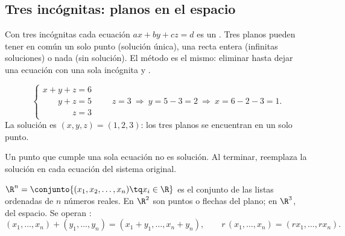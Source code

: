 \documentclass[11pt,a4paper]{article}
\let\zukanivel\nivel
\renewcommand{\nivel}[2]{\needspace{5\baselineskip}\zukanivel{#1}{#2}}
\begin{document}
\subsection{Tres incógnitas: planos en el espacio}
Con tres incógnitas cada ecuación $ax+by+cz=d$ es un . Tres planos pueden tener en común
un solo punto (solución única), una recta entera (infinitas soluciones) o nada (sin solución).
El método es el mismo: eliminar hasta dejar una ecuación con una sola incógnita y .

\begin{ejemplo}
\[ \begin{cases} x+y+z=6\\ \phantom{x+{}}y+z=5\\ \phantom{x+y+{}}z=3 \end{cases}
\qquad z=3\ \Longrightarrow\ y=5-3=2\ \Longrightarrow\ x=6-2-3=1. \]
La solución es $(x,y,z)=(1,2,3)$: los tres planos se encuentran en un solo punto.
\end{ejemplo}

\begin{ojo}
Un punto que cumple una sola ecuación no es solución. Al terminar, reemplaza la solución en cada ecuación del sistema original.
\end{ojo}


\begin{definicion}[El conjunto $\R^n$]
$\R^n=\conjunto{(x_1,x_2,\dots,x_n)\tq x_i\in\R}$ es el conjunto de las listas ordenadas de $n$ números reales.
En $\R^2$ son puntos o flechas del plano; en $\R^3$, del espacio. Se operan :
\[ (x_1,\dots,x_n)+(y_1,\dots,y_n)=(x_1+y_1,\dots,x_n+y_n),\qquad r\,(x_1,\dots,x_n)=(rx_1,\dots,rx_n). \]
\end{definicion}
\end{document}
